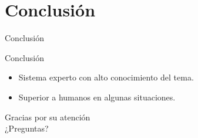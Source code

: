 \section{Conclusión}
\begin{frame}
\end{frame}

\begin{frame}{Conclusión}
 \begin{block}{Conclusión}
  \begin{itemize}
   \item Sistema experto con alto conocimiento del tema.
   \item Superior a humanos en algunas situaciones.
  \end{itemize}
 \end{block}
\end{frame}

\begin{frame}{}
 \begin{block}{}
 \begin{center}
  \large Gracias por su atención\\
  \large ¿Preguntas?
 \end{center}
 \end{block}
\end{frame}
